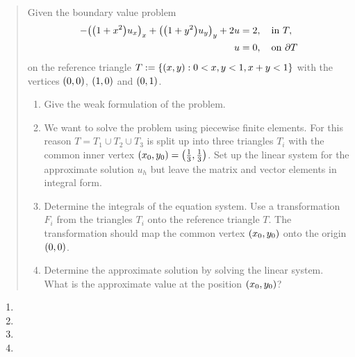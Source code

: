 \documentclass[english]{exercise}
\begin{document}
    \begin{quote}
        Given the boundary value problem
        \begin{align*}
            -\parentheses*{\parentheses*{1 + x^2}u_x}_x + \parentheses*{\parentheses*{1 + y^2}u_y}_y + 2u &= 2, \quad \text{in }T,\\
            u & =0, \quad \text{on }\partial T
        \end{align*}
        on the reference triangle \(T := \braces*{\parentheses*{x, y} : 0 < x, y < 1, x + y < 1}\) with the vertices \(\parentheses*{0, 0}\), \(\parentheses*{1, 0}\) and \(\parentheses*{0, 1}\).
        \begin{enumerate}
            \item Give the weak formulation of the problem.
            \item We want to solve the problem using piecewise finite elements.
            For this reason \(T = T_1 \cup T_2 \cup T_3\) is split up into three triangles \(T_i\) with the common inner vertex \(\parentheses*{x_0, y_0} = \parentheses*{\frac{1}{3}, \frac{1}{3}}\).
            Set up the linear system for the approximate solution \(u_h\) but leave the matrix and vector elements in integral form.
            \item Determine the integrals of the equation system.
            Use a transformation \(F_i\) from the triangles \(T_i\) onto the reference triangle \(T\).
            The transformation should map the common vertex \(\parentheses*{x_0, y_0}\) onto the origin \(\parentheses*{0, 0}\).
            \item Determine the approximate solution by solving the linear system.
            What is the approximate value at the position \(\parentheses*{x_0, y_0}\)?
        \end{enumerate}
    \end{quote}
    
    \begin{enumerate}
        \item
        \item
        \item
        \item
    \end{enumerate}
    
    \section{}
    
\end{document}

